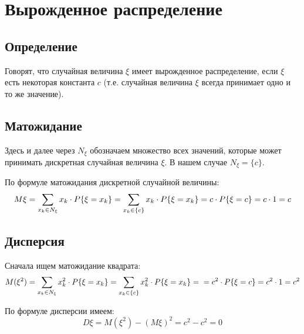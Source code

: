 \section{Вырожденное распределение}

\subsection{Определение}
Говорят, что случайная величина $\xi$ имеет вырожденное распределение, если $\xi$ есть некоторая константа $c$ (т.е. случайная величина $\xi$ всегда принимает одно и то же значение).

\subsection{Матожидание}
Здесь и далее через $N_\xi$ обозначаем множество всех значений, которые может принимать дискретная случайная величина $\xi$.
В нашем случае $N_\xi = \{c\}$.

По формуле матожидания дискретной случайной величины:
\begin{equation}
M\xi =
\sum\limits_{x_k \in N_\xi} x_k \cdot P\{\xi=x_k\} =
\sum\limits_{x_k \in \{c\}} x_k \cdot P\{\xi=x_k\} =
c \cdot P\{\xi=c\} = 
c \cdot 1 = 
c
\end{equation}

\subsection{Дисперсия}
Сначала ищем матожидание квадрата:
\begin{equation}
M(\xi^2) =
\sum\limits_{x_k \in N_\xi} x_k^2 \cdot P\{\xi=x_k\} =
\sum\limits_{x_k \in \{c\}} x_k^2 \cdot P\{\xi=x_k\} =
\\=
c^2 \cdot P\{\xi=c\} = 
c^2 \cdot 1 = 
c^2
\end{equation}

По формуле дисперсии имеем:
\begin{equation}
D\xi = 
M(\xi^2)-(M\xi)^2 = 
c^2 - c^2 =
0
\end{equation}


